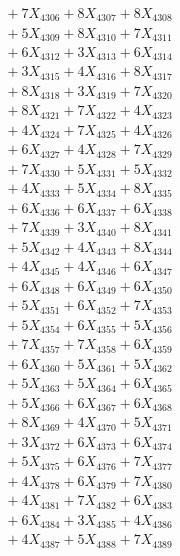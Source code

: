 \documentclass[a4paper,10pt]{article}
\begin{document}
{\begin{align}
&\;  + 7 X_{4306} + 8 X_{4307} + 8 X_{4308} \\[0.3ex]
&\;  + 5 X_{4309} + 8 X_{4310} + 7 X_{4311} \\[0.3ex]
&\;  + 6 X_{4312} + 3 X_{4313} + 6 X_{4314} \\[0.3ex]
&\;  + 3 X_{4315} + 4 X_{4316} + 8 X_{4317} \\[0.3ex]
&\;  + 8 X_{4318} + 3 X_{4319} + 7 X_{4320} \\[0.3ex]
&\;  + 8 X_{4321} + 7 X_{4322} + 4 X_{4323} \\[0.3ex]
&\;  + 4 X_{4324} + 7 X_{4325} + 4 X_{4326} \\[0.3ex]
&\;  + 6 X_{4327} + 4 X_{4328} + 7 X_{4329} \\[0.5ex]\allowbreak
&\;  + 7 X_{4330} + 5 X_{4331} + 5 X_{4332} \\[0.3ex]
&\;  + 4 X_{4333} + 5 X_{4334} + 8 X_{4335} \\[0.3ex]
&\;  + 6 X_{4336} + 6 X_{4337} + 6 X_{4338} \\[0.3ex]
&\;  + 7 X_{4339} + 3 X_{4340} + 8 X_{4341} \\[0.3ex]
&\;  + 5 X_{4342} + 4 X_{4343} + 8 X_{4344} \\[0.3ex]
&\;  + 4 X_{4345} + 4 X_{4346} + 6 X_{4347} \\[0.3ex]
&\;  + 6 X_{4348} + 6 X_{4349} + 6 X_{4350} \\[0.3ex]
&\;  + 5 X_{4351} + 6 X_{4352} + 7 X_{4353} \\[0.3ex]
&\;  + 5 X_{4354} + 6 X_{4355} + 5 X_{4356} \\[0.3ex]
&\;  + 7 X_{4357} + 7 X_{4358} + 6 X_{4359} \\[0.5ex]\allowbreak
&\;  + 6 X_{4360} + 5 X_{4361} + 5 X_{4362} \\[0.3ex]
&\;  + 5 X_{4363} + 5 X_{4364} + 6 X_{4365} \\[0.3ex]
&\;  + 5 X_{4366} + 6 X_{4367} + 6 X_{4368} \\[0.3ex]
&\;  + 8 X_{4369} + 4 X_{4370} + 5 X_{4371} \\[0.3ex]
&\;  + 3 X_{4372} + 6 X_{4373} + 6 X_{4374} \\[0.3ex]
&\;  + 5 X_{4375} + 6 X_{4376} + 7 X_{4377} \\[0.3ex]
&\;  + 4 X_{4378} + 6 X_{4379} + 7 X_{4380} \\[0.3ex]
&\;  + 4 X_{4381} + 7 X_{4382} + 6 X_{4383} \\[0.3ex]
&\;  + 6 X_{4384} + 3 X_{4385} + 4 X_{4386} \\[0.3ex]
&\;  + 4 X_{4387} + 5 X_{4388} + 7 X_{4389} \\[0.5ex]\allowbreak

\end{align}}
\end{document}
